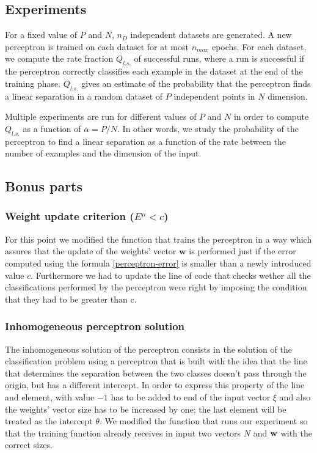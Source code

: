 \subsection{Experiments}
For a fixed value of $P$ and $N$, $n_D$ independent datasets are generated.
A new perceptron is trained on each dataset for at most $n_{max}$ epochs.
For each dataset, we compute the rate fraction $Q_{l.s.}$ of successful runs, where a run is successful if the perceptron correctly classifies each example in the dataset at the end of the training phase.
$Q_{l.s.}$ gives an estimate of the probability that the perceptron finds a linear separation in a random dataset of $P$ independent points in $N$ dimension.

Multiple experiments are run for different values of $P$ and $N$ in order to compute $Q_{l.s.}$ as a function of $\alpha = P / N$.
In other words, we study the probability of the perceptron to find a linear separation as a function of the rate between the number of examples and the dimension of the input.

\subsection{Bonus parts}
\subsubsection{Weight update criterion ($E^\mu < c$)}
For this point we modified the function that trains the perceptron in a way which assures that the update of the weights' vector $\mathsf{\bm{w}}$ is 
performed just if the error computed using the formula \ref{perceptron-error} is smaller than a newly introduced value $c$. Furthermore we had to update
the line of code that checks wether all the classifications performed by the perceptron were right by imposing the condition that they had to be greater than c.

\subsubsection{Inhomogeneous perceptron solution}
The inhomogeneous solution of the perceptron consists in the solution of the classification problem using a perceptron that is built with the idea that the line that determines
the separation between the two classes doesn't pass through the origin, but has a different intercept. In order to express this property of the line and element, with value $-1$ has to be added to
end of the input vector $\xi$ and also the weights' vector size has to be increased by one; the last element will be treated as the intercept $\theta$. We modified the function that runs
our experiment so that the training function already receives in input two vectors $N$ and $\mathsf{\bf{w}}$ with the correct sizes.